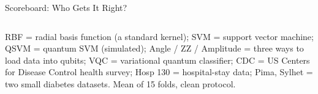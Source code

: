 \begin{frame}{Scoreboard: Who Gets It Right?}
\begin{columns}[c]
  \end{columns}
  \vfill
  {\tiny RBF = radial basis function (a standard kernel); SVM = support vector machine; QSVM = quantum SVM (simulated); Angle / ZZ / Amplitude = three ways to load data into qubits; VQC = variational quantum classifier; CDC = US Centers for Disease Control health survey; Hosp 130 = hospital-stay data; Pima, Sylhet = two small diabetes datasets. Mean of 15 folds, clean protocol.}
\end{frame}

